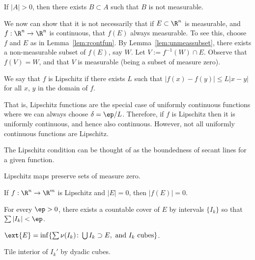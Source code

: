 

\begin{lem} \label{lem:unmeassubset}
If $|A|>0$, then there exists $B \subset A$ such that $B$ is not measurable. 
\end{lem}




We now can show that it is not necessarily that if $E \subset \R^n$ is measurable, and $f: \R^n \to \R^n$ is continuous, that $f(E)$ always measurable. To see this, choose $f$ and $E$ as in Lemma~\ref{lem:rcontfun}. By Lemma~\ref{lem:unmeassubset}, there exists a non-measurable subset of $f(E)$, say $W$. Let $V:= f^{-1}(W) \cap E$. Observe that $f(V)=W$, and that $V$ is measurable (being a subset of measure zero). 

\begin{dfn}[Lipschitz]
We say that $f$ is Lipschitz if there exists $L$ such that $|f(x)-f(y)| \leq L|x-y|$ for all $x$, $y$ in the domain of $f$. 
\end{dfn}

That is, Lipschitz functions are the special case of uniformly continuous functions where we can always choose $\delta=\ep/L$. Therefore, if $f$ is Lipschitz then it is uniformly continuous, and hence also continuous. However, not all uniformly continuous functions are Lipschitz. 


The Lipschitz condition can be thought of as the boundedness of secant lines for a given function. 

Lipschitz maps preserve sets of measure zero.

\begin{thm} \label{thm:lipmeaszero}
If $f: \R^n \to \R^m$ is Lipschitz and $|E|=0$, then $|f(E)|=0$. 
\end{thm}

\pf For every $\ep>0$, there exists a countable cover of $E$ by intervals $\{I_k\}$ so that $\sum |I_k| < \ep$. 



$\ext{E}= \inf \{ \sum \nu(I_k) \colon \bigcup I_k \supset E, \text{ and }I_k \text{ cubes}\}$.

Tile interior of $I_k'$ by dyadic cubes. 

